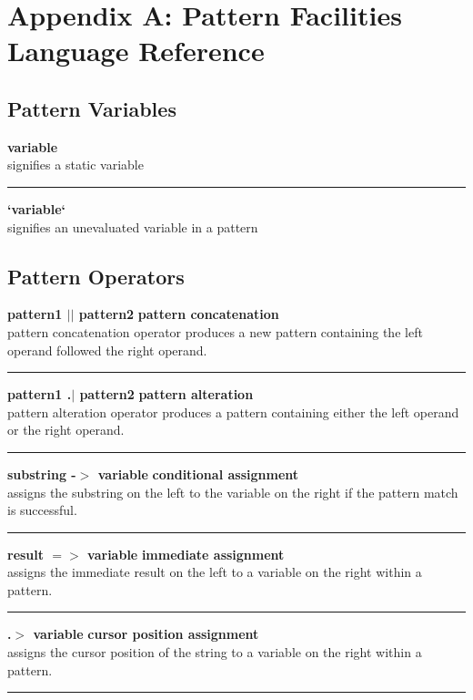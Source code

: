\documentclass{article}
\begin{document}
\section*{Appendix A: Pattern Facilities Language Reference} 
\subsection*{Pattern Variables}

\textbf{variable} \\
signifies a static variable\\
\noindent\rule{12cm}{0.4pt}
 
\noindent\textbf{`variable`} \\
signifies an unevaluated variable in a pattern\\

\subsection*{Pattern Operators}
\noindent\textbf{pattern1 $\vert\vert$	pattern2} \hfill \textbf{pattern concatenation}\\
pattern concatenation operator produces a new pattern containing the left operand followed the right operand.\\
\noindent\rule{12cm}{0.4pt}

\noindent\textbf{pattern1 .$\vert$ pattern2} \hfill \textbf{pattern alteration}\\
pattern alteration operator produces a pattern containing either the left operand or the right operand.\\
\noindent\rule{12cm}{0.1pt}

\noindent\textbf{substring -$>$ variable} \hfill\textbf{conditional assignment}\\
assigns the substring on the left to the variable on the right if the pattern match is successful.\\
\noindent\rule{12cm}{0.1pt}

\noindent\textbf{result $=>$ variable} \hfill\textbf{immediate assignment}\\
assigns the immediate result on the left to a variable on the right within a pattern.\\
\noindent\rule{12cm}{0.1pt}

\noindent\textbf{.$>$ variable} \hfill\textbf{cursor position assignment}\\
assigns the cursor position of the string to a variable on the right within a pattern.\\
\noindent\rule{12cm}{0.1pt}
\end{document}
